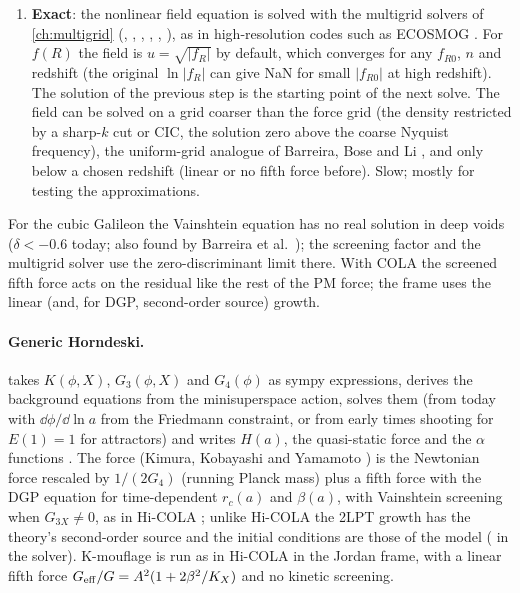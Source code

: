 \begin{enumerate}
\item \textbf{Exact}: the nonlinear field equation is solved with the multigrid solvers of \cref{ch:multigrid}
      (, ,
      , ,
      , ), as in
      high-resolution codes such as ECOSMOG \cite{Li2012ECOSMOG}.
      For $f(R)$ the field is $u=\sqrt{|f_R|}$ by default, which converges for any $f_{R0}$, $n$ and redshift (the
      original $\ln|f_R|$ can give NaN for small $|f_{R0}|$ at high redshift). The solution of the previous step is the
      starting point of the next solve. The field can be solved on a grid coarser than the force grid (the density
      restricted by a sharp-$k$ cut or CIC, the solution zero above the coarse Nyquist frequency), the uniform-grid
      analogue of Barreira, Bose and Li \cite{BarreiraBoseLi2015}, and only below a chosen redshift (linear or no fifth
      force before). Slow; mostly for testing the approximations.
\end{enumerate}
For the cubic Galileon the Vainshtein equation has no real solution in deep voids ($\delta<-0.6$ today; also found by
Barreira et al.\ \cite{Barreira2013}); the screening factor and the multigrid solver use the zero-discriminant limit
there. With COLA the screened fifth force acts on the residual like the rest of the PM force; the frame uses the linear
(and, for DGP, second-order source) growth.

\paragraph*{Generic Horndeski.}  takes $K(\phi,X)$, $G_3(\phi,X)$ and $G_4(\phi)$ as
sympy expressions, derives the background equations from the minisuperspace action, solves them (from today with
$\dd\phi/\dd\ln a$ from the Friedmann constraint, or from early times shooting for $E(1)=1$ for attractors) and writes
$H(a)$, the quasi-static force and the $\alpha$ functions \cite{Bellini2014}. The force (Kimura, Kobayashi and Yamamoto
\cite{Kimura2012}) is the Newtonian force rescaled by $1/(2G_4)$ (running Planck mass) plus a fifth force with the DGP
equation for time-dependent $r_c(a)$ and $\beta(a)$, with Vainshtein screening when $G_{3X}\neq0$, as in Hi-COLA
\cite{Wright2023}; unlike Hi-COLA the 2LPT growth has the theory's second-order source and the initial conditions
are those of the model ( in the solver). K-mouflage is run as in Hi-COLA in the Jordan frame,
with a linear fifth force $G_{\rm eff}/G=A^2(1+2\beta^2/K_X)$ and no kinetic screening.

